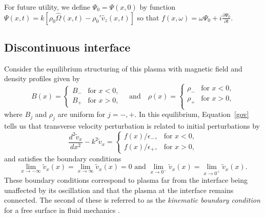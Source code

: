 \documentclass[12pt]{../style-files/ociamthesis}
\begin{document}
For future utility, we define $\Psi_0 = \Psi(x, 0)$ by function $\Psi(x, t) = k[\rho_0\hat{\Omega}(x, t) - \rho_0'\hat{v}_z(x, t)]$ so that $f(x, \omega) = \omega \Psi_0 + i\frac{\partial \Psi_0}{\partial t}$.


\subsection{Discontinuous interface}

Consider the equilibrium structuring of this plasma with magnetic field and density profiles given by
\begin{equation}
B(x)=
\begin{cases}
B_- & \text{for  }x<0, \\
B_+ & \text{for  }x>0,
\end{cases}
\quad \text{and} \quad
\rho(x)=
\begin{cases}
\rho_- & \text{for  }x<0, \\
\rho_+ & \text{for  }x>0, \\
\end{cases}
\end{equation}
where $B_j$ and $\rho_j$ are uniform for $j = -, +$. In this equilibrium, Equation~\eqref{gov} tells us that transverse velocity perturbation is related to initial perturbations by
\begin{equation}
\frac{d^2\tilde{v}_x}{dx^2} - k^2\tilde{v}_x = 
\begin{cases}
f(x)/\epsilon_-, & \text{for  } x < 0,\\
f(x)/\epsilon_+, & \text{for  } x > 0,
\end{cases}
\label{ivp interface gov}
\end{equation}
and satisfies the boundary conditions
\begin{equation}
\lim_{x \to -\infty}\tilde{v}_x(x) = \lim_{x \to \infty}\tilde{v}_x(x) = 0 \text{ and } \lim_{x \to 0^-}\tilde{v}_x(x) = \lim_{x \to 0^+}\tilde{v}_x(x).
\label{ivp interface BC}
\end{equation}
These boundary conditions correspond to plasma far from the interface being unaffected by its oscillation and that the plasma at the interface remains connected. The second of these is referred to as the \textit{kinematic boundary condition} for a free surface in fluid mechanics \citep{goe_etal04}.
\end{document}
